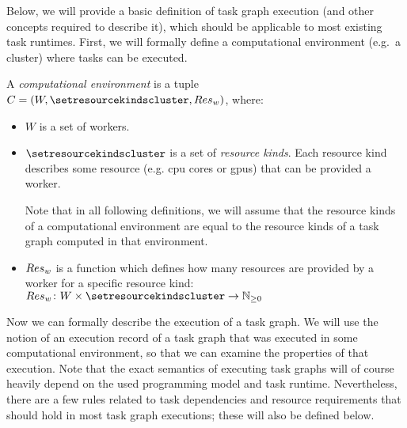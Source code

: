 Below, we will provide a basic definition of task graph execution (and other concepts required
to describe it), which should be applicable to most existing task runtimes. First, we will
formally define a computational environment (e.g.\ a cluster) where tasks can be executed.

\vspace{2mm} A \emph{computational environment} is a tuple $C = (W, \setresourcekindscluster, \fnworkerres)$, where:
\begin{itemize}[itemsep=0pt]
	\item $W$ is a set of workers.
	\item $\setresourcekindscluster$ is a set of \emph{resource kinds}. Each resource kind
	describes some resource (e.g. \gls{cpu} cores or \glspl{gpu}) that can be provided a
	worker.

	Note that in all following definitions, we will assume that the resource kinds
	of a computational environment are equal to the resource kinds of a task graph
	computed in that environment.
	\item $Res_w$ is a function which defines how many resources are
	provided by a worker for a specific resource kind: \\ $\fnworkerres\colon W \times \setresourcekindscluster \rightarrow
	\mathbb{N}_{\geq{}0}$
\end{itemize}

Now we can formally describe the execution of a task graph. We will use the notion of an
execution record of a task graph that was executed in some computational environment, so that we can
examine the properties of that execution. Note that the exact semantics of
executing task
graphs will of course heavily depend on the used programming model and task runtime.
Nevertheless, there are a few rules related to task dependencies and resource requirements that
should hold in most task graph executions; these will also be defined below.

